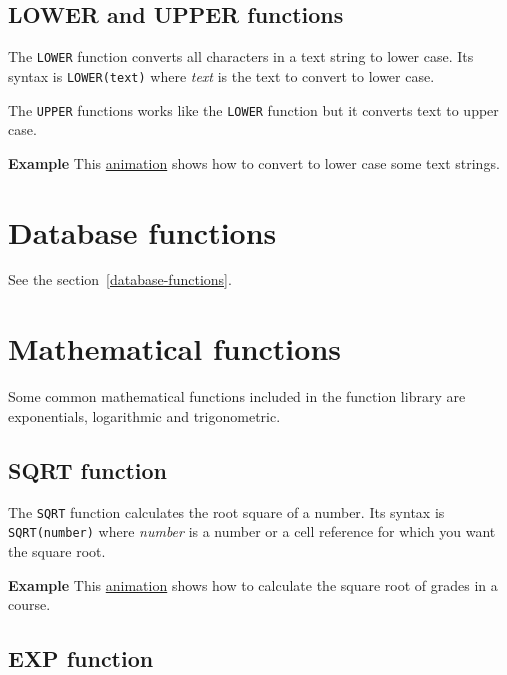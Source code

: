 \subsection{LOWER and UPPER functions}\label{lowerandupperfunctions}
The \texttt{LOWER} function converts all characters in a text string to lower case. Its syntax is \texttt{LOWER(text)} where \emph{text} is the text to convert to lower case.

The \texttt{UPPER} functions works like the \texttt{LOWER} function but it converts text to upper case. 

\textbf{Example} This \href{http://aprendeconalf.es/office/excel/manual/img/example_function_lower_upper.gif}{animation}
shows how to convert to lower case some text strings.



\section{Database functions}

See the section~\ref{database-functions}.

\section{Mathematical functions}\hypertarget{mathematical-functions}{}\label{mathematical-functions}

Some common mathematical functions included in the function library are exponentials, logarithmic and trigonometric.

\subsection{SQRT function}\hypertarget{sqrt-function}{}\label{sqrt-function}

The \texttt{SQRT} function calculates the root square of a number. Its syntax is \texttt{SQRT(number)} where \emph{number} is a number or a cell reference for which you want the square root.

\textbf{Example} This \href{http://aprendeconalf.es/office/excel/manual/img/example_function_sqrt.gif}{animation} shows how to calculate the square root of grades in a course.

\subsection{EXP function}\hypertarget{exp-function}{}\label{exp-function}

